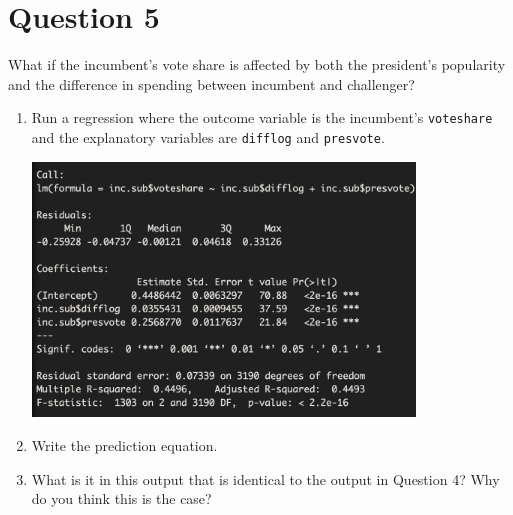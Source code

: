 \documentclass[12pt,letterpaper]{article}
\begin{document}
	\newpage	

\section*{Question 5}
\noindent What if the incumbent's vote share is affected by both the president's popularity and the difference in spending between incumbent and challenger? 
	\begin{enumerate}
		\item Run a regression where the outcome variable is the incumbent's \texttt{voteshare} and the explanatory variables are \texttt{difflog} and \texttt{presvote}.	
    	 
    	\includegraphics[width=0.8\textwidth]{q5.png}
	    \vspace{5cm}
		\item Write the prediction equation.	
		 
		\vspace{5cm}
		\item What is it in this output that is identical to the output in Question 4? Why do you think this is the case?
		 
	\end{enumerate}
\end{document}

